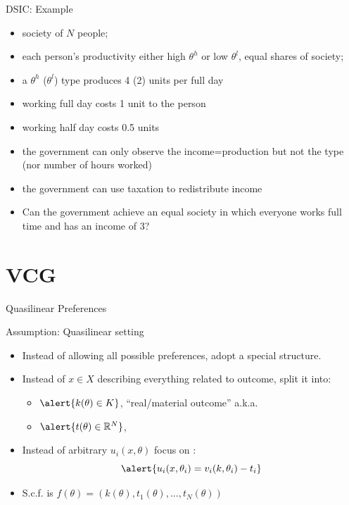 \documentclass[english,10pt
,aspectratio=169
]{beamer}
\begin{document}
\begin{frame}{DSIC: Example}
\begin{example}[Communism]
	\begin{itemize}
		\item society of $N$ people;
		\item each person's productivity either high $\theta^h$ or low $\theta^l$, equal shares of society;
		\item a $\theta^{h}$ ($\theta^{l}$) type produces 4 (2) units per full day
		\item working full day costs 1 unit to the person
		\item working half day costs 0.5 units
		\item the government can only observe the income=production but not the type (nor number of hours worked)
		\item the government can use taxation to redistribute income
		\item Can the government achieve an equal society in which everyone works full time and has an income of 3?
	\end{itemize}
\end{example}
\end{frame}



\section{VCG}

\begin{frame}{Quasilinear Preferences}
	\begin{alertblock}{Assumption: Quasilinear setting}
		\begin{itemize}
			\item Instead of allowing all possible preferences, adopt a special structure.
			\item Instead of $x \in X$ describing everything related to outcome, split it into:
			\begin{itemize}
				\item $\alert{k(\theta) \in K}$, ``real/material outcome'' a.k.a. 
				\item $\alert{t(\theta) \in \mathbb{R}^N}$, 
			\end{itemize}
			\item Instead of arbitrary $u_i(x,\theta)$ focus on :
			$$\alert{ u_i(x,\theta_i) = v_i(k,\theta_i) - t_i }$$
			\vspace{-1em}
			\item S.c.f. is $f(\theta) = \left( k(\theta), t_1(\theta), ..., t_N(\theta) \right)$
		\end{itemize}
	\end{alertblock}
\end{frame}
\end{document}
